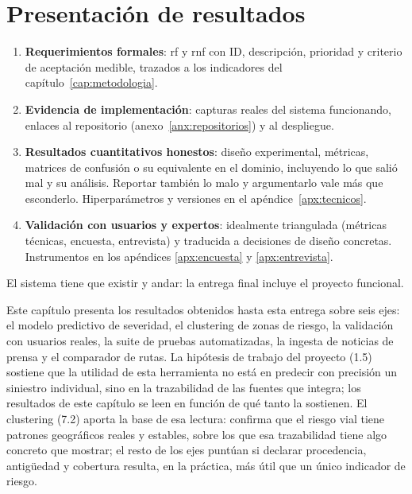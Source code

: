 
\chapter{Presentación de resultados}\label{cap:resultados}

\begin{guia}
\begin{enumerate}
    \item \textbf{Requerimientos formales}: \gls{rf} y \gls{rnf} con ID,
          descripción, prioridad y criterio de aceptación medible,
          trazados a los indicadores del capítulo~\ref{cap:metodologia}.
    \item \textbf{Evidencia de implementación}: capturas reales del sistema
          funcionando, enlaces al repositorio (anexo~\ref{anx:repositorios})
          y al despliegue.
    \item \textbf{Resultados cuantitativos honestos}: diseño experimental,
          métricas, matrices de confusión o su equivalente en el dominio,
          incluyendo lo que salió mal y su análisis. Reportar también lo
          malo y argumentarlo vale más que esconderlo. Hiperparámetros y
          versiones en el apéndice~\ref{apx:tecnicos}.
    \item \textbf{Validación con usuarios y expertos}: idealmente
          triangulada (métricas técnicas, encuesta, entrevista) y
          traducida a decisiones de diseño concretas. Instrumentos en los
          apéndices \ref{apx:encuesta} y \ref{apx:entrevista}.
\end{enumerate}
El sistema tiene que existir y andar: la entrega final incluye el
proyecto funcional.
\end{guia}

Este capítulo presenta los resultados obtenidos hasta esta entrega sobre
seis ejes: el modelo predictivo de severidad, el clustering de zonas de
riesgo, la validación con usuarios reales, la suite de pruebas
automatizadas, la ingesta de noticias de prensa y el comparador de
rutas. La hipótesis de trabajo del proyecto (1.5) sostiene que la
utilidad de esta herramienta no está en predecir con precisión un
siniestro individual, sino en la trazabilidad de las fuentes que
integra; los resultados de este capítulo se leen en función de qué tanto
la sostienen. El clustering (7.2) aporta la base de esa lectura:
confirma que el riesgo vial tiene patrones geográficos reales y
estables, sobre los que esa trazabilidad tiene algo concreto que
mostrar; el resto de los ejes puntúan si declarar procedencia,
antigüedad y cobertura resulta, en la práctica, más útil que un único
indicador de riesgo.

